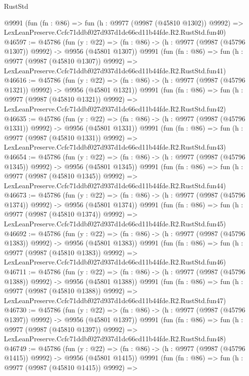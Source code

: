 \begin{lexlean}{RustStd}
\begin{coremodule}
    @9991
    (fun (fn : @86) =>
    fun (h : @9977 (@9987 (@45810 @1302)) @9992) =>
    LexLeanPreserve.Ccfc71ddbf027d937d1dc66cd11b44fde.R2.RustStd.fun40)
@46597 := @45786
    (fun (y : @22) =>
    (fn : @86) -> (h : @9977 (@9987 (@45796 @1307)) @9992) -> @9956 (@45801 @1307))
    @9991
    (fun (fn : @86) =>
    fun (h : @9977 (@9987 (@45810 @1307)) @9992) =>
    LexLeanPreserve.Ccfc71ddbf027d937d1dc66cd11b44fde.R2.RustStd.fun41)
@46616 := @45786
    (fun (y : @22) =>
    (fn : @86) -> (h : @9977 (@9987 (@45796 @1321)) @9992) -> @9956 (@45801 @1321))
    @9991
    (fun (fn : @86) =>
    fun (h : @9977 (@9987 (@45810 @1321)) @9992) =>
    LexLeanPreserve.Ccfc71ddbf027d937d1dc66cd11b44fde.R2.RustStd.fun42)
@46635 := @45786
    (fun (y : @22) =>
    (fn : @86) -> (h : @9977 (@9987 (@45796 @1331)) @9992) -> @9956 (@45801 @1331))
    @9991
    (fun (fn : @86) =>
    fun (h : @9977 (@9987 (@45810 @1331)) @9992) =>
    LexLeanPreserve.Ccfc71ddbf027d937d1dc66cd11b44fde.R2.RustStd.fun43)
@46654 := @45786
    (fun (y : @22) =>
    (fn : @86) -> (h : @9977 (@9987 (@45796 @1345)) @9992) -> @9956 (@45801 @1345))
    @9991
    (fun (fn : @86) =>
    fun (h : @9977 (@9987 (@45810 @1345)) @9992) =>
    LexLeanPreserve.Ccfc71ddbf027d937d1dc66cd11b44fde.R2.RustStd.fun44)
@46673 := @45786
    (fun (y : @22) =>
    (fn : @86) -> (h : @9977 (@9987 (@45796 @1374)) @9992) -> @9956 (@45801 @1374))
    @9991
    (fun (fn : @86) =>
    fun (h : @9977 (@9987 (@45810 @1374)) @9992) =>
    LexLeanPreserve.Ccfc71ddbf027d937d1dc66cd11b44fde.R2.RustStd.fun45)
@46692 := @45786
    (fun (y : @22) =>
    (fn : @86) -> (h : @9977 (@9987 (@45796 @1383)) @9992) -> @9956 (@45801 @1383))
    @9991
    (fun (fn : @86) =>
    fun (h : @9977 (@9987 (@45810 @1383)) @9992) =>
    LexLeanPreserve.Ccfc71ddbf027d937d1dc66cd11b44fde.R2.RustStd.fun46)
@46711 := @45786
    (fun (y : @22) =>
    (fn : @86) -> (h : @9977 (@9987 (@45796 @1388)) @9992) -> @9956 (@45801 @1388))
    @9991
    (fun (fn : @86) =>
    fun (h : @9977 (@9987 (@45810 @1388)) @9992) =>
    LexLeanPreserve.Ccfc71ddbf027d937d1dc66cd11b44fde.R2.RustStd.fun47)
@46730 := @45786
    (fun (y : @22) =>
    (fn : @86) -> (h : @9977 (@9987 (@45796 @1397)) @9992) -> @9956 (@45801 @1397))
    @9991
    (fun (fn : @86) =>
    fun (h : @9977 (@9987 (@45810 @1397)) @9992) =>
    LexLeanPreserve.Ccfc71ddbf027d937d1dc66cd11b44fde.R2.RustStd.fun48)
@46749 := @45786
    (fun (y : @22) =>
    (fn : @86) -> (h : @9977 (@9987 (@45796 @1415)) @9992) -> @9956 (@45801 @1415))
    @9991
    (fun (fn : @86) =>
    fun (h : @9977 (@9987 (@45810 @1415)) @9992) =>

\end{coremodule}
\end{lexlean}
